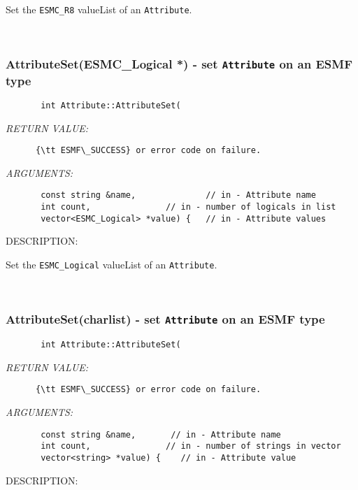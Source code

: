       Set the {\tt ESMC\_R8} valueList of an {\tt Attribute}.
   
 
\mbox{}\hrulefill\
 
\subsubsection [AttributeSet(ESMC\_Logical] {AttributeSet(ESMC\_Logical *) - set {\tt Attribute} on an ESMF type}


  
\begin{verbatim}       int Attribute::AttributeSet(\end{verbatim}{\em RETURN VALUE:}
\begin{verbatim}      {\tt ESMF\_SUCCESS} or error code on failure.
   \end{verbatim}{\em ARGUMENTS:}
\begin{verbatim}       const string &name,              // in - Attribute name
       int count,               // in - number of logicals in list
       vector<ESMC_Logical> *value) {   // in - Attribute values
   \end{verbatim}
{\sf DESCRIPTION:\\ }


      Set the {\tt ESMC\_Logical} valueList of an {\tt Attribute}.
   
 
\mbox{}\hrulefill\
 
\subsubsection [AttributeSet(charlist)] {AttributeSet(charlist) - set {\tt Attribute} on an ESMF type}


  
\begin{verbatim}       int Attribute::AttributeSet(\end{verbatim}{\em RETURN VALUE:}
\begin{verbatim}      {\tt ESMF\_SUCCESS} or error code on failure.
   \end{verbatim}{\em ARGUMENTS:}
\begin{verbatim}       const string &name,       // in - Attribute name
       int count,               // in - number of strings in vector
       vector<string> *value) {    // in - Attribute value
   \end{verbatim}
{\sf DESCRIPTION:\\ }


